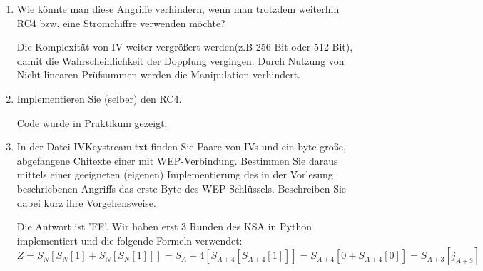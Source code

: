 \documentclass[12pt,a4paper]{article}
\newenvironment{exercise}
	{\begin{enumerate}[label=\bfseries\alph*).]\bfseries}
{\end{enumerate}}
\newenvironment{answer}{\par\normalfont}{}
\begin{document}
\begin{exercise}
\begin{answer}
		Ein Angreifer kann eine beliebige Nachricht wählen, die CRC-Prüfsumme dazu bilden,
		das Ganze mit dem bekannten Schlüsselstrom XOR-verknüpfen und den passenden
		IV dahinter anfügen.\\
		Ein Angreifer kann auch gezielt die Bits der IP-Zieladresse so abändern, dass das Paket in ein vom Angreifer kontrolliertes Netzwerk umgeleitet wird. Er kann dann die andere Headerfeld so abändern, dass die Prüfsumme gleich beleibt. AP wird die Paket dann entschlüsselt und umleitet.
		\end{answer}
		\item  Wie könnte man diese Angriffe verhindern, wenn man trotzdem weiterhin RC4 bzw. eine Stromchiffre verwenden möchte?
		\begin{answer}
		Die Komplexität von IV weiter vergrößert werden(z.B 256 Bit oder 512 Bit), damit die Wahrscheinlichkeit der Dopplung vergingen.
		Durch Nutzung von Nicht-linearen Prüfsummen werden die Manipulation verhindert.
		 
		\end{answer}
		\item Implementieren Sie (selber) den RC4.
		\begin{answer}
					Code wurde in Praktikum gezeigt.
		\end{answer}
		\item In der Datei IVKeystream.txt finden Sie Paare von IVs und ein byte große, abgefangene Chitexte einer mit WEP-Verbindung. Bestimmen Sie daraus mittels einer geeigneten (eigenen) Implementierung des in der Vorlesung beschriebenen Angriffs das erste Byte des WEP-Schlüssels. Beschreiben Sie dabei kurz ihre Vorgehensweise.
		\begin{answer}
		Die Antwort ist 'FF'.
		Wir haben erst 3 Runden des KSA in Python implementiert und die folgende Formeln verwendet:
		\[Z=S_N[S_N[1]+S_N[S_N[1]]]=S_A+4[S_{A+4}[S_{A+4}[1]]]=S_{A+4}[0+S_{A+4}[0]]=S_{A+3}[j_{A+3}]\]
		\end{answer}
    	\end{exercise}
    
\end{document}
